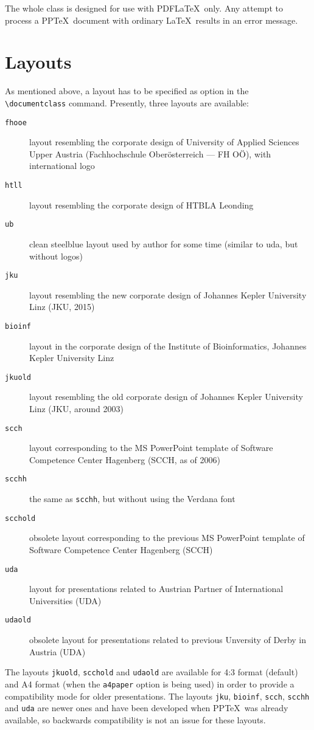 \documentclass[twoside,a4paper,11pt]{article}
\def\PPTeX{{\upshape PP\TeX{}}}
\begin{document}
The whole class is designed for use\NOTE{} with PDF\LaTeX\ only. Any
attempt to process a \PPTeX\ document with ordinary \LaTeX\ results
in an error message.

\section{Layouts}

As mentioned above, a layout has to be specified as option in the
\verb+\documentclass+ command. Presently, three layouts are
available:
\begin{description}
\item[\texttt{fhooe}] layout resembling the corporate design of
University of Applied Sciences Upper Austria (Fachhochschule Ober\"osterreich --- FH O\"O),
with international logo
\item[\texttt{htll}] layout resembling the corporate design of
HTBLA Leonding
\item[\texttt{ub}] clean steelblue layout used by author for some time (similar to uda, but without logos)
\item[\texttt{jku}] layout resembling the new corporate design of
Johannes Kepler University Linz (JKU, 2015)
\item[\texttt{bioinf}] layout in the corporate design of the
Institute of Bioinformatics, Johannes Kepler University Linz
\item[\texttt{jkuold}] layout resembling the old corporate design of
Johannes Kepler University Linz (JKU, around 2003)
\item[\texttt{scch}] layout corresponding to the MS PowerPoint
template of Software Competence Center Hagenberg (SCCH, as of 2006)
\item[\texttt{scchh}] the same as \texttt{scchh}, but without using
the Verdana font
\item[\texttt{scchold}] obsolete layout corresponding to the previous MS PowerPoint
template of Software Competence Center Hagenberg (SCCH)
\item[\texttt{uda}] layout for presentations related to Austrian Partner of International Universities (UDA)
\item[\texttt{udaold}] obsolete layout for presentations related to previous Unversity of Derby in Austria (UDA)
\end{description}
The layouts \verb+jkuold+, \verb+scchold+ and \verb+udaold+ are
available for 4:3 format (default) and A4 format (when the
\verb+a4paper+ option is being used) in order to provide a
compatibility mode for older presentations. The layouts
\verb+jku+, \verb+bioinf+, \verb+scch+, \verb+scchh+  and \verb+uda+ are newer
ones and have been developed when \PPTeX\ was already available, so
backwards compatibility is not an issue for these layouts.
\end{document}
